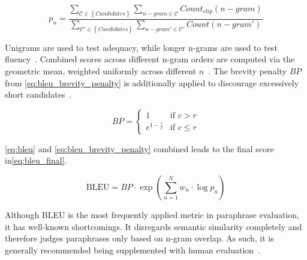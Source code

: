 \begin{equation}
    p_n = \frac{\sum_{\mathcal{C} \in \left\{ Candidates \right\}}\sum_{n-gram \in\mathcal{C}}Count_{clip}(n-gram)}{\sum_{\mathcal{C'} \in \left\{ Candidates \right\}}\sum_{n-gram' \in\mathcal{C'}}Count(n-gram')}
\label{eq:bleu}
\end{equation}

Unigrams are used to test adequacy, while longer n-grams are used to test fluency~\citep{papineni_bleu_2001}.
Combined scores across different n-gram orders are computed via the geometric mean, weighted uniformly across different $n$~\citep{papineni_bleu_2001,banerjee_METEOR_2005}. 
The brevity penalty $BP$ from \autoref{eq:bleu_brevity_penalty} is additionally applied to discourage excessively short candidates~\citep{papineni_bleu_2001}.

\begin{equation}
    BP = \begin{cases}
        1 & \text{if } c > r \\
        e^{1 - \frac{r}{c}} & \text{if } c \leq r
    \end{cases}
\label{eq:bleu_brevity_penalty}
\end{equation}

\autoref{eq:bleu} and \autoref{eq:bleu_brevity_penalty} combined leads to the final score in\autoref{eq:bleu_final}.

\begin{equation}
    \text{BLEU} = BP \cdot \exp\left(\sum_{n=1}^{N} w_n \cdot \log p_n\right)
\label{eq:bleu_final}
\end{equation}

Although BLEU is the most frequently applied metric in paraphrase evaluation, it has well-known shortcomings. 
It disregards semantic similarity completely and therefore judges paraphrases only based on n-gram overlap. 
As such, it is generally recommended being supplemented with human evaluation~\citep{zhou_paraphrase_2021}.






